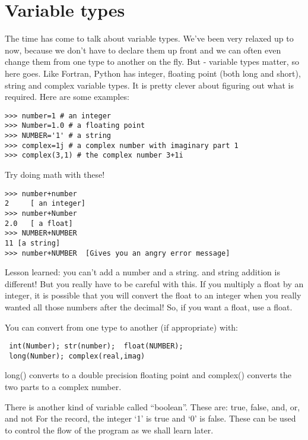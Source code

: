 \section{Variable types}

The time has come to talk about variable types.  We've been very relaxed up to now, because we don't have to declare them up front and we can often even change them from one type to another on the fly.  But - variable types matter, so here goes.  Like Fortran, Python has integer, floating point (both long and short), string and complex variable types.  It is pretty clever about figuring out what is required.   Here are some examples:

{\singlespacing \color{blue} \begin{verbatim}
>>> number=1 # an integer
>>> Number=1.0 # a floating point
>>> NUMBER='1' # a string
>>> complex=1j # a complex number with imaginary part 1
>>> complex(3,1) # the complex number 3+1i 
\end{verbatim}}
\noindent
{Try doing math with these!}
{\singlespacing \color{blue} \begin{verbatim}
>>> number+number
2     [ an integer]
>>> number+Number
2.0   [ a float]
>>> NUMBER+NUMBER
11 [a string]
>>> number+NUMBER  [Gives you an angry error message]
\end{verbatim}}
\noindent
 Lesson learned: you can't add a number and a string.  and string addition is different!  But you really have to be careful with this.  If you multiply a float by an integer, it is possible that you will convert the float to an integer when you really wanted all those numbers after the decimal! So, if you want a float, use a float.  
 
{ You can convert from one type to another (if appropriate) with:}
{\singlespacing \color{blue} \begin{verbatim} 
 int(Number); str(number);  float(NUMBER); 
 long(Number); complex(real,imag)
 \end{verbatim}}
 
\noindent 
{\color{blue}long()} converts to a double precision floating point and {\color{blue}complex()} converts the two parts to a complex number.
 
 There is another kind of variable called ``boolean''. These are: {\color{blue}true}, {\color{blue}false}, {\color{blue}and}, {\color{blue}or}, and {\color{blue}not}
For the record, the integer  `1' is {\color{blue}true} and  `0' is {\color{blue}false}.  
These can be used to control the flow of the program as we shall learn later.  

